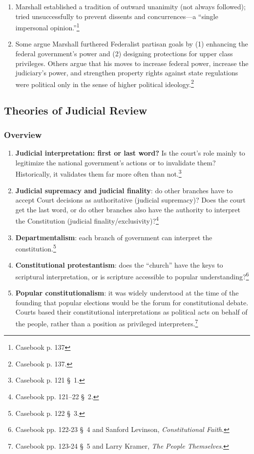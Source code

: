 \begin{enumerate}
    \item Marshall established a tradition of outward unanimity (not always 
    followed); tried unsuccessfully to prevent dissents and concurrences---a 
    ``single impersonal opinion.''\footnote{Casebook p. 137}
    \item Some argue Marshall furthered Federalist partisan goals by (1) 
    enhancing the federal government's power and (2) designing protections for 
    upper class privileges. Others argue that his moves to increase federal 
    power, increase the judiciary's power, and strengthen property rights 
    against state regulations were political only in the sense of higher 
    political ideology.\footnote{Casebook p. 137.}
\end{enumerate}

\subsection{Theories of Judicial Review}

\subsubsection{Overview}

\begin{enumerate}
    \item \textbf{Judicial interpretation: first or last word?} Is the court's 
    role mainly to legitimize the national government's actions or to 
    invalidate them? Historically, it validates them far more often than 
    not.\footnote{Casebook p. 121 \S\ 1.}
    \item \textbf{Judicial supremacy and judicial finality}: do other branches 
    have to accept Court decisions as authoritative (judicial supremacy)? Does 
    the court get the last word, or do other branches also have the authority 
    to interpret the Constitution (judicial 
    finality/exclusivity)?\footnote{Casebook pp. 121--22 \S\ 2.}
    \item \textbf{Departmentalism}: each branch of government can interpret 
    the constitution.\footnote{Casebook p. 122 \S\ 3.}
    \item \textbf{Constitutional protestantism}: does the ``church'' have the 
    keys to scriptural interpretation, or is scripture accessible to popular 
    understanding?\footnote{Casebook pp. 122-23 \S\ 4 and Sanford Levinson, 
    \emph{Constitutional Faith}.}
    \item \textbf{Popular constitutionalism}: it was widely understood at the 
    time of the founding that popular elections would be the forum for 
    constitutional debate. Courts based their constitutional interpretations 
    as political acts on behalf of the people, rather than a position as 
    privileged interpreters.\footnote{Casebook pp. 123-24 \S\ 5 and Larry 
    Kramer, \emph{The People Themselves}.}
\end{enumerate}

